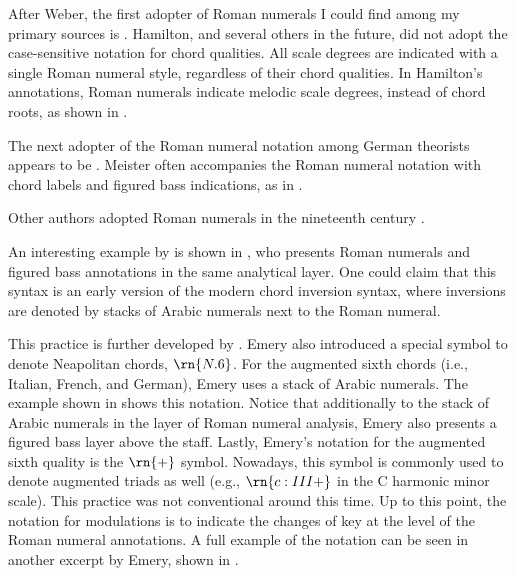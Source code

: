 After Weber, the first adopter of Roman numerals I could
find among my primary sources is
\textcite{hamilton1840catechism}. Hamilton, and several
others in the future, did not adopt the case-sensitive
notation for chord qualities. All scale degrees are
indicated with a single Roman numeral style, regardless of
their chord qualities. In Hamilton's annotations, Roman
numerals indicate melodic scale degrees, instead of chord
roots, as shown in
.


The next adopter of the Roman numeral notation among German
theorists appears to be \textcite{meister1852vollstandige}.
Meister often accompanies the Roman numeral notation with
chord labels and figured bass indications, as in
.


Other authors adopted Roman numerals in the nineteenth
century \parencite{sechter1853grundsatze,
richter1860lehrbuch, tiersch1874elementarbuch,
tracy1878theory}.

An interesting example by \textcite{bussler1878praktische}
is shown in
, who
presents Roman numerals and figured bass annotations in the
same analytical layer. One could claim that this syntax is
an early version of the modern chord inversion syntax, where
inversions are denoted by stacks of Arabic numerals next to
the Roman numeral.


This practice is further developed by
\textcite{emery1879elements}. Emery also introduced a
special symbol to denote Neapolitan chords, $\rn{N.6}$. For
the augmented sixth chords (i.e., Italian, French, and
German), Emery uses a stack of Arabic numerals. The example
shown in  shows
this notation. Notice that additionally to the stack of
Arabic numerals in the layer of Roman numeral analysis,
Emery also presents a figured bass layer above the staff.
Lastly, Emery's notation for the augmented sixth quality is
the $\rn{+}$ symbol. Nowadays, this symbol is commonly used
to denote augmented triads as well (e.g., $\rn{c:III+}$ in
the C harmonic minor scale). This practice was not
conventional around this time. Up to this point, the
notation for modulations is to indicate the changes of key
at the level of the Roman numeral annotations. A full
example of the notation can be seen in another excerpt by
Emery, shown in
.

